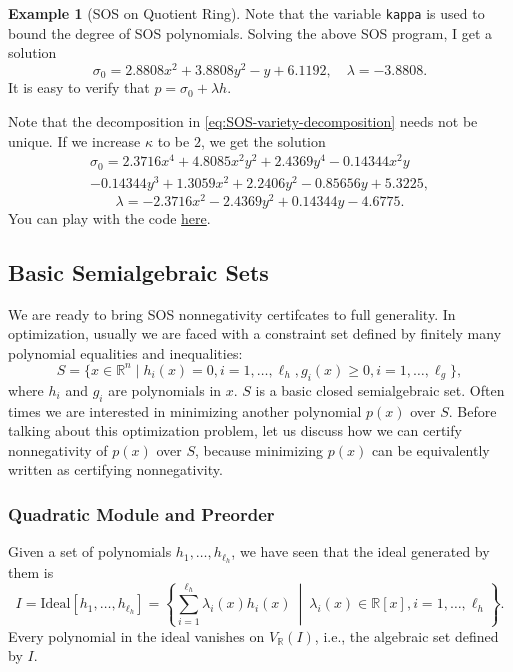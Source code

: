 \documentclass[
]{book}
\theoremstyle{definition}
\theoremstyle{definition}
\newtheorem{example}{Example}[chapter]
\theoremstyle{definition}
\theoremstyle{definition}
\theoremstyle{remark}
\begin{document}
\begin{example}[SOS on Quotient Ring]
Note that the variable \texttt{kappa} is used to bound the degree of SOS polynomials. Solving the above SOS program, I get a solution
\[
\sigma_0 = 2.8808 x^2 + 3.8808 y ^2 - y + 6.1192, \quad \lambda = -3.8808.
\]
It is easy to verify that \(p = \sigma_0 + \lambda h\).

Note that the decomposition in \eqref{eq:SOS-variety-decomposition} needs not be unique. If we increase \(\kappa\) to be \(2\), we get the solution
\begin{equation}
\begin{split}
\sigma_0 = 2.3716 x^4 + 4.8085 x^2 y^2 + 2.4369 y^4 - 0.14344 x^2 y \\ - 0.14344 y^3 + 1.3059 x^2 + 2.2406 y^2 - 0.85656 y + 5.3225,
\end{split}
\end{equation}
\[
\lambda = -2.3716 x^2 - 2.4369 y^2 + 0.14344 y - 4.6775.
\]
You can play with the code \href{https://github.com/ComputationalRobotics/Semidefinite-Examples/blob/main/sos_quotient_ring.m}{here}.
\end{example}

\subsection{Basic Semialgebraic Sets}\label{basic-semialgebraic-sets}

We are ready to bring SOS nonnegativity certifcates to full generality. In optimization, usually we are faced with a constraint set defined by finitely many polynomial equalities and inequalities:
\begin{equation}
S = \{ x \in \mathbb{R}^{n} \mid h_i(x)=0, i=1,\dots,\ell_h, g_i(x) \geq 0, i = 1,\dots,\ell_g \},
\label{eq:basic-semialgebraic-set}
\end{equation}
where \(h_i\) and \(g_i\) are polynomials in \(x\). \(S\) is a basic closed semialgebraic set. Often times we are interested in minimizing another polynomial \(p(x)\) over \(S\). Before talking about this optimization problem, let us discuss how we can certify nonnegativity of \(p(x)\) over \(S\), because minimizing \(p(x)\) can be equivalently written as certifying nonnegativity.

\subsubsection{Quadratic Module and Preorder}\label{quadratic-module-and-preorder}

Given a set of polynomials \(h_1,\dots,h_{\ell_h}\), we have seen that the ideal generated by them is
\[
I=\mathrm{Ideal}[h_1,\dots,h_{\ell_h}] =  \left\{ \sum_{i=1}^{\ell_h} \lambda_i(x) h_i(x) \ \middle\vert\ \lambda_i(x) \in \mathbb{R}[x],i=1,\dots,\ell_h  \right\} .
\]
Every polynomial in the ideal vanishes on \(V_{\mathbb{R}}(I)\), i.e., the algebraic set defined by \(I\).
\end{document}
